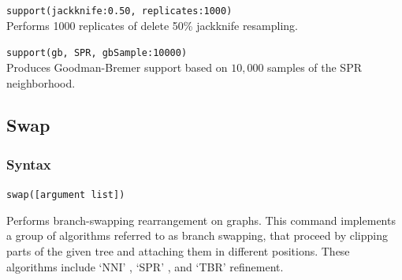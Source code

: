 		
		\begin{example}
		
			\item{\texttt{support(jackknife:0.50, replicates:1000)}\\Performs 1000 replicates of 
			delete 50\% jackknife resampling.}
				
			\item{\texttt{support(gb, SPR, gbSample:10000)}\\Produces Goodman-Bremer 
			support based on $10,000$ samples of the SPR neighborhood.}
			
		\end{example}

\subsection{Swap} 
\label{subsec:swap}
	\subsubsection{Syntax}
		\texttt{swap([argument list])}
			
	\begin{phygdescription}
		{Performs branch-swapping rearrangement on graphs. This command implements a 
		group of algorithms referred to as branch swapping, that proceed by clipping
		parts of the given tree and attaching them in different positions. These algorithms 
		include `NNI' \citep{CaminandSokal1965, Robinson1971}, `SPR' \citep{Dayhoff1969}, 
		and `TBR' \citep{Farris1988, swofford1990a} refinement. 
		}
	\end{phygdescription}
		
